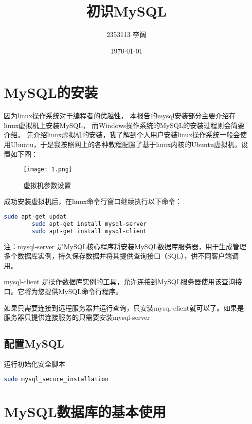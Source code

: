 \documentclass[12pt]{article}
\title{初识MySQL}
\author{2353113 李阔}
\date{\today}
\begin{document}
\maketitle
\tableofcontents
\newpage
\section{MySQL的安装}
	{\songti 因为linux操作系统对于编程者的优越性，
		本报告的mysql安装部分主要介绍在linux虚拟机上安装MySQL，
		而Windows操作系统的MySQL的安装过程则会简要介绍。
		先介绍linux虚拟机的安装，我了解到个人用户安装linux操作系统一般会使用Ubuntu，于是我按照网上的各种教程配置了基于linux内核的Ubuntu虚拟机，设置如下图：

  \begin{figure}[htbp]
\centering
\texttt{[image: 1.png]}
\caption{虚拟机参数设置}
\label{figure}
\end{figure}
	}
 	{\songti 成功安装虚拟机后，在linux命令行窗口继续执行以下命令：
	}



\begin{lstlisting}[language=Bash]
        sudo apt-get updat
        sudo apt-get install mysql-server
        sudo apt-get install mysql-client

\end{lstlisting}


{\songti


    注：mysql-server 是MySQL核心程序将安装MySQL数据库服务器，用于生成管理多个数据库实例，持久保存数据并将其提供查询接口（SQL），供不同客户端调用。

mysql-client 是操作数据库实例的工具，允许连接到MySQL服务器使用该查询接口。它将为您提供MySQL命令行程序。

如果只需要连接到远程服务器并运行查询，只安装mysql-client就可以了。如果是服务器只提供连接服务的只需要安装mysql-server


}
\subsection{配置MySQL}
{\songti 运行初始化安全脚本}
\begin{lstlisting}[language=Bash]
        sudo mysql_secure_installation
\end{lstlisting}


\section{MySQL数据库的基本使用}
\end{document}
